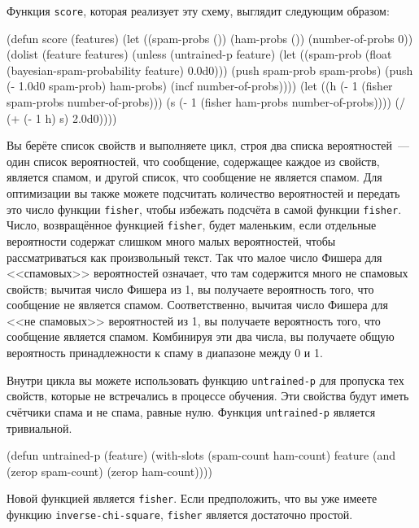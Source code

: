 Функция \lstinline{score}, которая реализует эту схему, выглядит следующим образом:

\begin{myverb}
(defun score (features)
  (let ((spam-probs ()) (ham-probs ()) (number-of-probs 0))
    (dolist (feature features)
      (unless (untrained-p feature)
        (let ((spam-prob (float (bayesian-spam-probability feature) 0.0d0)))
          (push spam-prob spam-probs)
          (push (- 1.0d0 spam-prob) ham-probs)
          (incf number-of-probs))))
    (let ((h (- 1 (fisher spam-probs number-of-probs)))
          (s (- 1 (fisher ham-probs number-of-probs))))
      (/ (+ (- 1 h) s) 2.0d0))))
\end{myverb}

Вы берёте список свойств и выполняете цикл, строя два списка вероятностей~--- один список
вероятностей, что сообщение, содержащее каждое из свойств, является спамом, и другой
список, что сообщение не является спамом.  Для оптимизации вы также можете подсчитать
количество вероятностей и передать это число функции \lstinline{fisher}, чтобы избежать
подсчёта в самой функции \lstinline{fisher}.  Число, возвращённое функцией \lstinline{fisher}, будет
маленьким, если отдельные вероятности содержат слишком много малых вероятностей, чтобы
рассматриваться как произвольный текст.  Так что малое число Фишера для <<спамовых>>
вероятностей означает, что там содержится много не спамовых свойств; вычитая число Фишера
из 1, вы получаете вероятность того, что сообщение не является спамом.  Соответственно,
вычитая число Фишера для <<не спамовых>> вероятностей из 1, вы получаете вероятность того, что
сообщение является спамом.  Комбинируя эти два числа, вы получаете общую вероятность
принадлежности к спаму в диапазоне между 0 и 1.

Внутри цикла вы можете использовать функцию \lstinline{untrained-p} для пропуска тех свойств,
которые не встречались в процессе обучения.  Эти свойства будут иметь счётчики спама и не
спама, равные нулю.  Функция \lstinline{untrained-p} является тривиальной.

\begin{myverb}
(defun untrained-p (feature)
  (with-slots (spam-count ham-count) feature
    (and (zerop spam-count) (zerop ham-count))))
\end{myverb}

Новой функцией является \lstinline{fisher}.  Если предположить, что вы уже имеете функцию
\lstinline{inverse-chi-square}, \lstinline{fisher} является достаточно простой.

